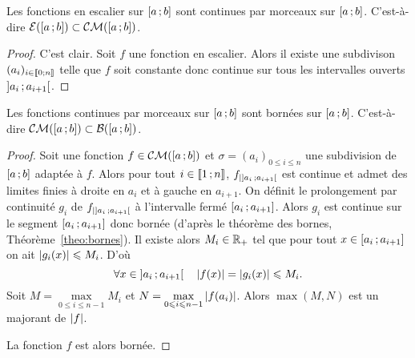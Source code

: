 \begin{prop}
  Les fonctions en escalier sur \(\left[ a \, ;  b \right]\) sont continues par morceaux sur \(\left[ a \, ;  b \right]\). C'est-à-dire \(\mathcal{E}(\left[ a \, ;  b \right]) \subset \mathcal{CM}(\left[ a \, ;  b \right])\).
\end{prop}
\begin{proof}
  C'est clair. Soit \(f\) une fonction en escalier. Alors il existe une subdivison \((a_i)_{i \in \mathopen{\llbracket}0\mathclose{}\mathpunct{};n\mathclose{\rrbracket}}\) telle que \(f\) soit constante donc continue sur tous les intervalles ouverts \(\left] a_i \, ;  a_{i+1} \right[\).
\end{proof}

\begin{prop}
  Les fonctions continues par morceaux sur \(\left[ a \, ;  b \right]\) sont bornées sur \(\left[ a \, ;  b \right]\). C'est-à-dire \(\mathcal{CM}(\left[ a \, ;  b \right]) \subset \mathcal{B}(\left[ a \, ;  b \right])\).
\end{prop}
\begin{proof}
  Soit une fonction \(f \in \mathcal{CM}(\left[ a \, ;  b \right])\) et \(\sigma=(a_i)_{0 \leqslant i \leqslant n}\) une subdivision de \(\left[ a \, ;  b \right]\) adaptée à \(f\). Alors pour tout \(i \in \mathopen{\llbracket}1\mathclose{}\mathpunct{};n\mathclose{\rrbracket}\), \(f_{|\left] a_i \, ;  a_{i+1} \right[}\) est continue et admet des limites finies à droite en \(a_{i}\) et à gauche en \(a_{i+1}\). On définit le prolongement par continuité \(g_i\) de \(f_{|\left] a_i \, ;  a_{i+1} \right[}\) à l'intervalle fermé \(\left[ a_i \, ;  a_{i+1} \right]\). Alors \(g_i\) est continue sur le segment \(\left[ a_i \, ;  a_{i+1} \right]\) donc bornée (d'après le théorème des bornes, Théorème~\ref{theo:bornes}). Il existe alors \(M_i \in \mathbb{R}_+\) tel que pour tout \(x \in \left[ a_i \, ;  a_{i+1} \right] \) on ait \(\left\lvert g_i(x)\right\rvert \leqslant M_i\). D'où
  \begin{equation}
    \forall x \in \left] a_i \, ;  a_{i+1} \right[ \quad \left\lvert f(x)\right\rvert=\left\lvert g_i(x)\right\rvert \leqslant M_i.
  \end{equation}
  Soit \(M=\max\limits_{0 \leqslant i \leqslant n-1} M_i\) et \(N=\max\limits_{0 \leqslant i \leqslant n-1} \left\lvert f(a_i)\right\rvert\). Alors \(\max(M,N)\) est un majorant de \(\left\lvert f\right\rvert\).

  La fonction \(f\) est alors bornée.
\end{proof}

